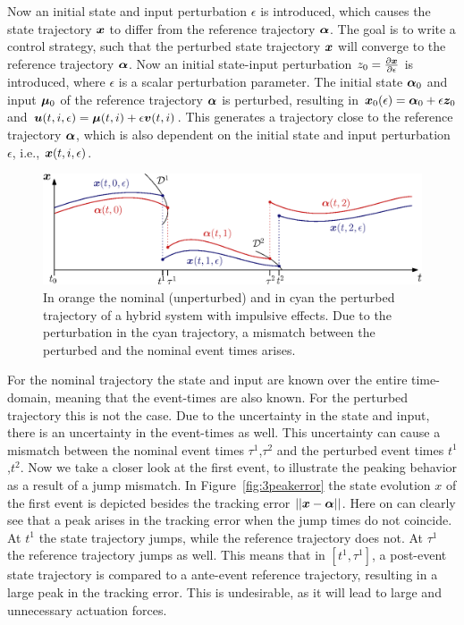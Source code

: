 \documentclass[../DC2017114Bouma.tex]{subfiles}
\begin{document}
Now an initial state and input perturbation $\epsilon$ is introduced, which causes the state trajectory ${\boldsymbol{x}}$ to differ from the reference trajectory $\boldsymbol{\alpha}$. The goal is to write a control strategy, such that the perturbed state trajectory ${\boldsymbol{x}}$ will converge to the reference trajectory $\boldsymbol{\alpha}$. Now an initial state-input perturbation $z_0 = \frac{\partial{\boldsymbol{x}}}{\partial\epsilon}$ is introduced, where $\epsilon$ is a scalar perturbation parameter. The initial state $\boldsymbol{\alpha}_0$ and input $\boldsymbol{\mu}_0$ of the reference trajectory $\boldsymbol{\alpha}$ is perturbed, resulting in ${\boldsymbol{x}}_0(\epsilon) = \boldsymbol{\alpha}_0 + \epsilon{\boldsymbol{z}}_0$ and ${\boldsymbol{u}}(t,i,\epsilon) = \boldsymbol{\mu}(t,i) + \epsilon{\boldsymbol{v}}(t,i)$. This generates a trajectory close to the reference trajectory $\boldsymbol{\alpha}$, which is also dependent on the initial state and input perturbation $\epsilon$, i.e., ${\boldsymbol{x}}(t,i,\epsilon)$.
%
%
\begin{figure}[h]
\centering
\includegraphics[width=.9\textwidth]{perturbedtraj.eps}\caption{In orange the nominal (unperturbed) and in cyan the perturbed trajectory of a hybrid system with impulsive effects. Due to the perturbation in the cyan trajectory, a mismatch between the perturbed and the nominal event times arises.} \label{fig:3perturbedtraj}
\end{figure}
For the nominal trajectory the state and input are known over the entire time-domain, meaning that the event-times are also known. For the perturbed trajectory this is not the case. Due to the uncertainty in the state and input, there is an uncertainty in the event-times as well. This uncertainty can cause a mismatch between the nominal event times $\tau^1$,$\tau^2$ and the perturbed event times $t^1$,$t^2$. Now we take a closer look at the first event, to illustrate the peaking behavior as a result of a jump mismatch. In Figure~\ref{fig:3peakerror} the state evolution $x$ of the first event is depicted besides the tracking error $||{\boldsymbol{x}}-\boldsymbol{\alpha}||$. Here on can clearly see that a peak arises in the tracking error when the jump times do not coincide. At $t^1$ the state trajectory jumps, while the reference trajectory does not. At $\tau^1$ the reference trajectory jumps as well. This means that in $[t^1,\tau^1]$, a post-event state trajectory is compared to a ante-event reference trajectory, resulting in a large peak in the tracking error. This is undesirable, as it will lead to large and unnecessary actuation forces.
\end{document}
